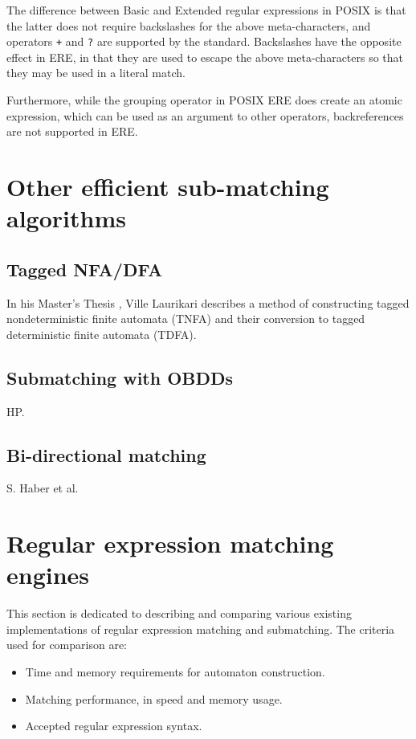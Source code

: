 The difference between Basic and Extended regular expressions in POSIX is that
the latter does not require backslashes for the above meta-characters, and
operators \verb'+' and \verb'?' are supported by the standard. Backslashes have
the opposite effect in ERE, in that they are used to escape the above
meta-characters so that they may be used in a literal match.

Furthermore, while the grouping operator in POSIX ERE does create an atomic
expression, which can be used as an argument to other operators, backreferences
are not supported in ERE.


\section{Other efficient sub-matching algorithms}

\subsection{Tagged NFA/DFA}

In his Master's Thesis \cite{laurikari}, Ville Laurikari describes a method of
constructing tagged nondeterministic finite automata (TNFA) and their conversion
to tagged deterministic finite automata (TDFA).


\subsection{Submatching with OBDDs}

HP.


\subsection{Bi-directional matching}

S. Haber et al.


\section{Regular expression matching engines}

This section is dedicated to describing and comparing various existing
implementations of regular expression matching and submatching. The criteria
used for comparison are:

\begin{itemize}
   \item Time and memory requirements for automaton construction.
   \item Matching performance, in speed and memory usage.
   \item Accepted regular expression syntax.
\end{itemize}



